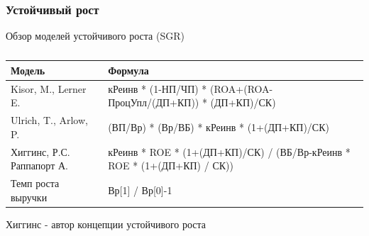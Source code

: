 \documentclass[_Banking_p2.tex]{subfiles}
\begin{document}
\subsubsection{Устойчивый рост}
\begin{frame}[shrink=20]{Обзор моделей устойчивого роста (SGR)}
\begin{table}[htbp]
\centering
\footnotesize
\caption{}
\begin{tabularx}{\linewidth}[b]{@{}>{\raggedright\arraybackslash}lX}
	\setrulecolor\toprule           
Модель & Формула                                                                 \\ \midrule
	Kisor, M., Lerner E.                    & кРеинв * (1-НП/ЧП) * (ROA+(ROA-ПроцУпл/(ДП+КП)) * (ДП+КП)/СК)           \\
	Ulrich, T., Arlow, P.                   & (ВП/Вр) * (Вр/ВБ) * кРеинв * (1+(ДП+КП)/СК)                             \\
	Хиггинс, Р.С. Раппапорт А.              & кРеинв * ROE * (1+(ДП+КП)/СК) / (ВБ/Вр-кРеинв * ROE * (1+(ДП+КП) / СК)) \\
	Темп роста выручки                      & Вр[1] / Вр[0]-1                                                         \\ \bottomrule
\end{tabularx}%
\label{tab:addlabel}%
\end{table}%
Хиггинс - автор концепции устойчивого роста
\end{frame}
\end{document}
